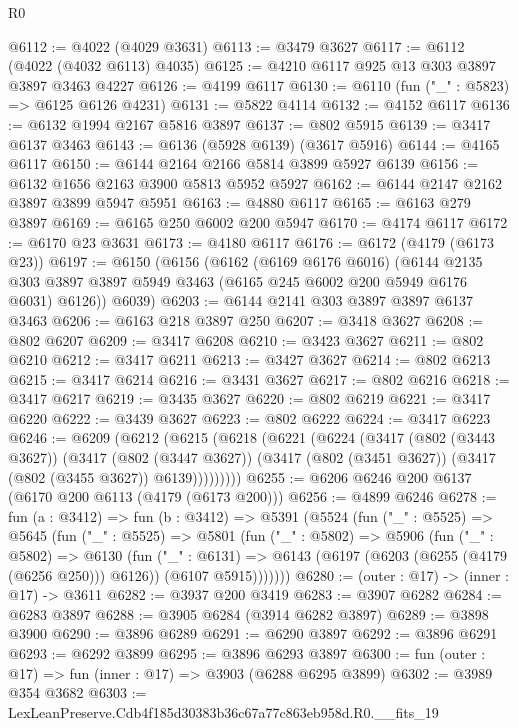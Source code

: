 \begin{lexlean}{R0}
\begin{coremodule}
@6112 := @4022 (@4029 @3631)
@6113 := @3479 @3627
@6117 := @6112 (@4022 (@4032 @6113) @4035)
@6125 := @4210 @6117 @925 @13 @303 @3897 @3897 @3463 @4227
@6126 := @4199 @6117
@6130 := @6110 (fun ("_" : @5823) => @6125 @6126 @4231)
@6131 := @5822 @4114
@6132 := @4152 @6117
@6136 := @6132 @1994 @2167 @5816 @3897
@6137 := @802 @5915
@6139 := @3417 @6137 @3463
@6143 := @6136 (@5928 @6139) (@3617 @5916)
@6144 := @4165 @6117
@6150 := @6144 @2164 @2166 @5814 @3899 @5927 @6139
@6156 := @6132 @1656 @2163 @3900 @5813 @5952 @5927
@6162 := @6144 @2147 @2162 @3897 @3899 @5947 @5951
@6163 := @4880 @6117
@6165 := @6163 @279 @3897
@6169 := @6165 @250 @6002 @200 @5947
@6170 := @4174 @6117
@6172 := @6170 @23 @3631
@6173 := @4180 @6117
@6176 := @6172 (@4179 (@6173 @23))
@6197 := @6150
    (@6156
      (@6162
        (@6169 @6176 @6016)
        (@6144 @2135 @303 @3897 @3897 @5949 @3463 (@6165 @245 @6002 @200 @5949 @6176 @6031) @6126))
      @6039)
@6203 := @6144 @2141 @303 @3897 @3897 @6137 @3463
@6206 := @6163 @218 @3897 @250
@6207 := @3418 @3627
@6208 := @802 @6207
@6209 := @3417 @6208
@6210 := @3423 @3627
@6211 := @802 @6210
@6212 := @3417 @6211
@6213 := @3427 @3627
@6214 := @802 @6213
@6215 := @3417 @6214
@6216 := @3431 @3627
@6217 := @802 @6216
@6218 := @3417 @6217
@6219 := @3435 @3627
@6220 := @802 @6219
@6221 := @3417 @6220
@6222 := @3439 @3627
@6223 := @802 @6222
@6224 := @3417 @6223
@6246 := @6209
    (@6212
      (@6215
        (@6218
          (@6221
            (@6224
              (@3417
                (@802 (@3443 @3627))
                (@3417
                  (@802 (@3447 @3627))
                  (@3417 (@802 (@3451 @3627)) (@3417 (@802 (@3455 @3627)) @6139)))))))))
@6255 := @6206 @6246 @200 @6137 (@6170 @200 @6113 (@4179 (@6173 @200)))
@6256 := @4899 @6246
@6278 := fun (a : @3412) =>
  fun (b : @3412) =>
  @5391
    (@5524
      (fun ("_" : @5525) =>
      @5645
        (fun ("_" : @5525) =>
        @5801
          (fun ("_" : @5802) =>
          @5906
            (fun ("_" : @5802) =>
            @6130
              (fun ("_" : @6131) =>
              @6143 (@6197 (@6203 (@6255 (@4179 (@6256 @250))) @6126)) (@6107 @5915)))))))
@6280 := (outer : @17) -> (inner : @17) -> @3611
@6282 := @3937 @200 @3419
@6283 := @3907 @6282
@6284 := @6283 @3897
@6288 := @3905 @6284 (@3914 @6282 @3897)
@6289 := @3898 @3900
@6290 := @3896 @6289
@6291 := @6290 @3897
@6292 := @3896 @6291
@6293 := @6292 @3899
@6295 := @3896 @6293 @3897
@6300 := fun (outer : @17) => fun (inner : @17) => @3903 (@6288 @6295 @3899)
@6302 := @3989 @354 @3682
@6303 := LexLeanPreserve.Cdb4f185d30383b36c67a77c863eb958d.R0.__fits_19

\end{coremodule}
\end{lexlean}
